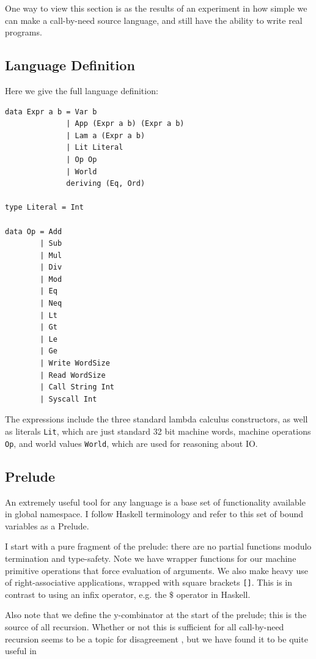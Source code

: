 One way to view this section is as the results of an experiment in how simple we
can make a call-by-need source language, and still have the ability to write
real programs. 

\subsection{Language Definition}

Here we give the full language definition: 

\begin{verbatim}
data Expr a b = Var b
              | App (Expr a b) (Expr a b)
              | Lam a (Expr a b)
              | Lit Literal
              | Op Op
              | World
              deriving (Eq, Ord)

type Literal = Int

data Op = Add 
        | Sub 
        | Mul 
        | Div 
        | Mod 
        | Eq 
        | Neq 
        | Lt 
        | Gt 
        | Le 
        | Ge 
        | Write WordSize 
        | Read WordSize 
        | Call String Int 
        | Syscall Int
\end{verbatim}

The expressions include the three standard lambda calculus constructors, as well
as literals \texttt{Lit}, which are just standard 32 bit machine words, machine
operations \texttt{Op}, and world values \texttt{World}, which are used for
reasoning about IO. 

\subsection{Prelude}
An extremely useful tool for any language is a base set of functionality
available in global namespace. I follow Haskell terminology and refer to this
set of bound variables as a Prelude. 

I start with a pure fragment of the prelude: there are no partial functions
modulo termination and type-safety. Note we have wrapper functions for our
machine primitive operations that force evaluation of arguments. We also make
heavy use of right-associative applications, wrapped with square brackets
\texttt{[]}. This is in contrast to using an infix operator, e.g. the $\$$
operator in Haskell.

Also note that we define the y-combinator at the start of the prelude; this is
the source of all recursion. Whether or not this is sufficient for all
call-by-need recursion seems to be a topic for disagreement \cite{ariola}, but
we have found it to be quite useful in     

